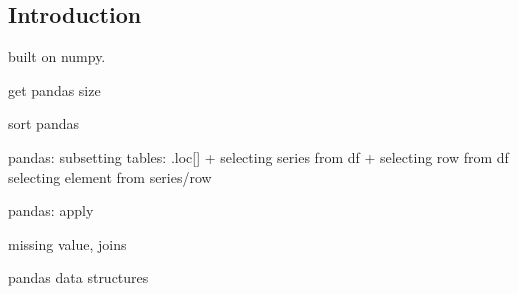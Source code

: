 
\subsection{Introduction}

built on numpy.

get pandas size

sort pandas

pandas:
subsetting tables: .loc[]
+ selecting series from df
+ selecting row from df
selecting element from series/row

pandas: apply

missing value, joins

pandas data structures
